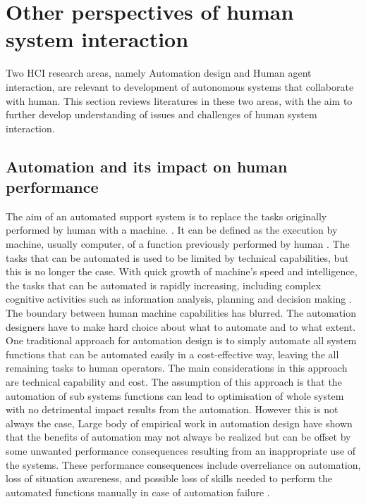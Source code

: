 


\section{Other perspectives of human system interaction}
Two \ac{HCI} research areas, namely Automation design and Human agent interaction, are relevant to development of autonomous systems that collaborate with human. This section reviews literatures in these two areas, with the aim to further develop understanding of issues and challenges of human system interaction. \\


\subsection{Automation and its impact on human performance}
The aim of an automated support system is to replace the tasks originally performed by human with a machine. \cite{Bradshaw2011} . It can be defined as the execution by machine, usually computer, of a function previously performed by human \cite{Parasuraman1997}. The tasks that can be automated is used to be limited by technical capabilities, but this is no longer the case. With quick growth of machine's speed and intelligence, the tasks that can be automated is rapidly increasing, including complex cognitive activities such as information analysis, planning and decision making \cite{Parasuraman2000}. The boundary between human machine capabilities has blurred. The automation designers have to make hard choice about what to automate and to what extent.\\

One traditional approach for automation design is to simply automate all system functions that can be automated easily in a cost-effective way, leaving the all remaining tasks to human operators. The main considerations in this approach are technical capability and cost. The assumption of this approach is that the automation of sub systems functions can lead to optimisation of whole system with no detrimental impact results from the automation. However this is not always the case, Large body of empirical work in automation design \cite{Manzey2012,Parasuraman2000} have shown that the benefits of automation may not always be realized but can be offset by some unwanted performance consequences resulting from an inappropriate use of the systems. These performance consequences include overreliance on automation, loss of situation awareness, and possible loss of skills needed to perform the automated functions manually in case of automation failure \cite{Kaber1997}.\\ 

